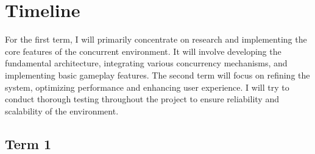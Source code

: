 \documentclass[]{plan}
\begin{document}

\chapter{Timeline}

For the first term, I will primarily concentrate on research and implementing the core features of the concurrent
environment. It will involve developing the fundamental architecture, integrating various concurrency mechanisms,
and implementing basic gameplay features. The second term will focus on refining the system,
optimizing performance and enhancing user experience. I will try to conduct thorough testing throughout
the project to ensure reliability and scalability of the environment.

\section{Term 1}
\end{document}
